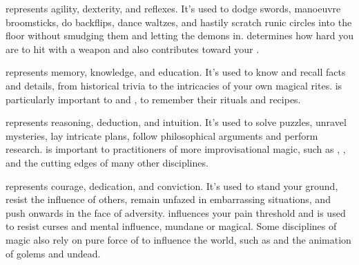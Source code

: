 

 represents agility, dexterity, and reflexes.
It's used to dodge swords, manoeuvre broomsticks, do backflips, dance waltzes, and hastily scratch runic circles into the floor without smudging them and letting the demons in.
 determines how hard you are to hit with a weapon and also contributes toward your .



 represents memory, knowledge, and education.
It's used to know and recall facts and details, from historical trivia to the intricacies of your own magical rites.
 is particularly important to  and , to remember their rituals and recipes.



 represents reasoning, deduction, and intuition.
It's used to solve puzzles, unravel mysteries, lay intricate plans, follow philosophical arguments and perform research.
 is important to practitioners of more improvisational magic, such as , , and the cutting edges of many other disciplines.



 represents courage, dedication, and conviction.
It's used to stand your ground, resist the influence of others, remain unfazed in embarrassing situations, and push onwards in the face of adversity.
 influences your pain threshold and is used to resist curses and mental influence, mundane or magical.
Some disciplines of magic also rely on pure force of  to influence the world, such as  and the animation of golems and undead.

